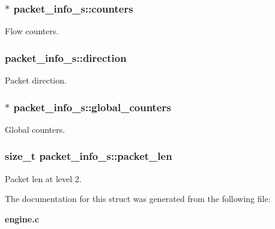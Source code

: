 \subsubsection[{counters}]{$\ast$ packet\+\_\+info\+\_\+s\+::counters}\label{structpacket__info__s_af735e249b83dc2855bad3eb823c770be}


Flow counters. 

\subsubsection[{direction}]{ packet\+\_\+info\+\_\+s\+::direction}\label{structpacket__info__s_ac8ab4e7c00ec07b9444c7a52f83eb892}


Packet direction. 

\subsubsection[{global\+\_\+counters}]{$\ast$ packet\+\_\+info\+\_\+s\+::global\+\_\+counters}\label{structpacket__info__s_a4d1609e7554b71ba9f97e973aee535ee}


Global counters. 

\subsubsection[{packet\+\_\+len}]{\setlength{\rightskip}{0pt plus 5cm}size\+\_\+t packet\+\_\+info\+\_\+s\+::packet\+\_\+len}\label{structpacket__info__s_a1f6f94ed26fa196c221624ee9a2a7c6a}


Packet len at level 2. 



The documentation for this struct was generated from the following file\+:\begin{DoxyCompactItemize}
\item 
{\bf engine.\+c}\end{DoxyCompactItemize}
